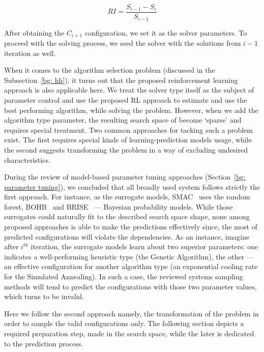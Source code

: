 \begin{equation}
RI = \frac{S_{i-1} - S_{i}}{S_{i-1}}
\label{concept: RI formula}
\end{equation}

After obtaining the $C_{i+1}$ configuration, we set it as the solver parameters. To proceed with the solving process, we seed the solver with the solutions from $i-1$ iteration as well.

When it comes to the algorithm selection problem (discussed in the Subsection~\ref{bg: hh}), it turns out that the proposed reinforcement learning approach is also applicable here. We treat the solver type itself as the subject of parameter control and use the proposed RL approach to estimate and use the best performing algorithm, while solving the problem. However, when we add the algorithm type parameter, the resulting search space of become `sparse' and requires special treatment. Two common approaches for tacking such a problem exist. The first requires special kinds of learning-prediction models usage, while the second suggests transforming the problem in a way of excluding undesired characteristics.

During the review of model-based parameter tuning approaches (Section~\ref{bg: parameter tuning}), we concluded that all broadly used system follows strictly the first approach. For instance, as the surrogate models, SMAC~\cite{hutter2011sequential} uses the random forest, BOHB~\cite{falkner2018bohb} and BRISE~\cite{brise2spl} — Bayesian probability models. While those surrogates could naturally fit to the described search space shape, none among proposed approaches is able to make the predictions effectively since, the most of predicted configurations will violate the dependencies. As an instance, imagine after $i^{th}$ iteration, the surrogate models learn about two superior parameters: one indicates a well-performing heuristic type (the Genetic Algorithm), the other — an effective configuration for another algorithm type (an exponential cooling rate for the Simulated Annealing). In such a case, the reviewed systems sampling methods will tend to predict the configurations with those two parameter values, which turns to be invalid.

Here we follow the second approach namely, the transformation of the problem in order to sample the valid configurations only. The following section depicts a required preparation step, made in the search space, while the later is dedicated to the prediction process.


